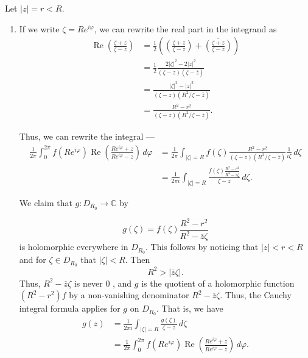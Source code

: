 \documentclass[12 pt, letterpaper]{hmcpset}
\begin{document}
\begin{solution} 
	Let $\lvert z  \rvert = r < R$.
	\begin{enumerate}
		\item If we write $\zeta = R e^{i \varphi}$, we can rewrite the real part in the integrand as
			\[
				\begin{split}
					\operatorname{Re} \left ( \frac{\zeta + z}{\zeta - z} \right ) & = \frac{1}{2} \left ( \left ( \frac{\zeta + z}{\zeta - z} \right ) + \overline{\left ( \frac{\zeta + z}{\zeta - z} \right )} \right ) \\
												       & = \frac{1}{2} \frac{2 \lvert \zeta \rvert^{2} - 2 \lvert z \rvert^{2}}{(\zeta - z)(\overline{\zeta} - \overline{z})} \\
												       & = \frac{\lvert \zeta \rvert^{2} - \lvert z \rvert^{2}}{(\zeta - z)(R^{2} / \zeta - \overline{z})} \\
												       & = \frac{R^{2} - r^{2}}{(\zeta - z)(R^{2} / \zeta - \overline{z})}.
				\end{split}
			\]

			Thus, we can rewrite the integral ---
			\[
				\begin{split}
					\frac{1}{2 \pi} \int_{0}^{2 \pi} f(R e^{i \varphi}) \operatorname{Re}\left ( \frac{R e^{i \varphi} + z}{R e^{i \varphi} - z} \right ) \, d\varphi & = \frac{1}{2 \pi} \int_{\lvert \zeta \rvert = R} f(\zeta) \frac{R^{2} - r^{2}}{(\zeta - z)(R^{2} / \zeta - \overline{z})} \frac{1}{i \zeta} \, d \zeta \\
																							  & = \frac{1}{2 \pi i} \int_{\lvert \zeta \rvert = R} \frac{f(\zeta) \frac{R^{2} - r^{2}}{R^{2} - \overline{z} \zeta}}{\zeta - z} \, d \zeta.
				\end{split}
			\]

			We claim that $g : D_{R_{0}} \to \mathbb{C}$ by

			\[
				g(\zeta) = f(\zeta) \frac{R^{2} - r^{2}}{R^{2} - \overline{z} \zeta}
			\]
			is holomorphic everywhere in $D_{R_{0}}$. This follows by noticing that $\lvert z \rvert < r < R$ and for $\zeta \in D_{R_{0}}$ that $\lvert \zeta \rvert < R$. Then
			\[
				R^{2} > \lvert \overline{z} \zeta \rvert.
			\]
			Thus, $R^{2} - \overline{z} \zeta$ is never $0$ , and $g$ is the quotient of a holomorphic function $(R^{2} - r^{2}) f$ by a non-vanishing denominator $R^{2} - \overline{z} \zeta$. Thus, the Cauchy integral formula applies for $g$ on $D_{R_{0}}$. That is, we have
			\[
				\begin{split}
					g(z) & = \frac{1}{2 \pi i} \int_{\lvert \zeta \rvert = R} \frac{g(\zeta)}{\zeta - z} \, d\zeta \\
					     & = \frac{1}{2 \pi} \int_{0}^{2 \pi} f(R e^{i \varphi}) \operatorname{Re} \left ( \frac{R e^{i \varphi} + z}{R e^{i \varphi} - z} \right ) \, d \varphi.
				\end{split}
			\]


\end{enumerate}
\end{solution}
\end{document}
